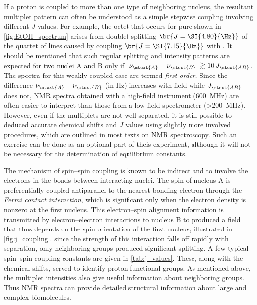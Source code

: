 \documentclass[nobib,nofonts,nols,nohyper,draft]{tufte-handout}
\begin{document}
If a proton is coupled to more than one type of neighboring nucleus, the resultant multiplet pattern can often be understood as a simple stepwise coupling involving different \( J \) values.
For example, the  octet that occurs for pure  shown in \cref{fig:EtOH_spectrum} arises from  doublet splitting \( \br{J = \SI{4.80}{\Hz}} \) of the quartet of lines caused by coupling \( \br{J = \SI{7.15}{\Hz}} \) with . 
It should be mentioned that such regular splitting and intensity patterns are expected for two nuclei A and B only if \( \abs{\nu_\mtext{A} - \nu_\mtext{B}} \gtrsim 10\,J_\mtext{AB} \). 
The spectra for this weakly coupled case are termed \emph{first order.}
Since the difference \( \nu_\mtext{A} - \nu_\mtext{B} \) (in \si{\Hz}) increases with field while \( J_\mtext{AB} \) does not, NMR spectra obtained with a high-field instrument (\SI{600}{\MHz}) are often easier to interpret than those from a low-field spectrometer (\SI{>200}{\MHz}). 
However, even if the multiplets are not well separated, it is still possible to deduced accurate chemical shifts and \( J \) values using slightly more involved procedures, which are outlined in most texts on NMR spectroscopy.\autocite{davis1965advanced,pople1959nmr,silverstein2005spec,burdett1964a,rogers1956a}
Such an exercise can be done as an optional part of theis experiment, although it will not be necessary for the determination of equilibrium constants. 

The mechanism of spin--spin coupling is known to be indirect and to involve the electrons in the bonds between interacting nuclei. 
The spin of nucleus A is preferentially coupled antiparallel to the nearest bonding electron through the \emph{Fermi contact interaction}, which is significant only when the electron density is nonzero at the first nucleus.
This electron--spin alignment information is transmitted by electron--electron interactions to nucleus B to produced a field that thus depends on the spin orientation of the first nucleus, illustrated in \cref{fig:j_coupling}. 
since the strength of this interaction falls off rapidly with separation, only neighboring groups produced significant splitting. 
A few typical spin--spin coupling constants are given in \cref{tab:j_values}. 
These, along with the chemical shifts, served to identify proton functional groups. 
As mentioned above, the multiplet intensities also give useful information about neighboring groups. 
Thus NMR spectra can provide detailed structural information about large and complex biomolecules. 
\end{document}
